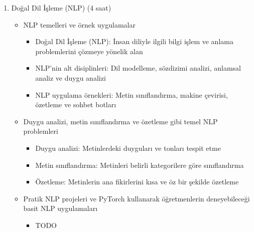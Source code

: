 \documentclass[12pt]{article}
\begin{document}
\begin{enumerate}
    
    \item Doğal Dil İşleme (NLP) (4 saat)
    \begin{itemize}
        \item NLP temelleri ve örnek uygulamalar
        \begin{itemize}
            \item Doğal Dil İşleme (NLP): İnsan diliyle ilgili bilgi işlem ve anlama problemlerini çözmeye yönelik alan
            \item NLP'nin alt disiplinleri: Dil modelleme, sözdizimi analizi, anlamsal analiz ve duygu analizi
            \item NLP uygulama örnekleri: Metin sınıflandırma, makine çevirisi, özetleme ve sohbet botları
        \end{itemize}
        \item Duygu analizi, metin sınıflandırma ve özetleme gibi temel NLP problemleri
        \begin{itemize}
            \item Duygu analizi: Metinlerdeki duyguları ve tonları tespit etme
            \item Metin sınıflandırma: Metinleri belirli kategorilere göre sınıflandırma
            \item Özetleme: Metinlerin ana fikirlerini kısa ve öz bir şekilde özetleme
        \end{itemize}
        \item Pratik NLP projeleri ve PyTorch kullanarak öğretmenlerin deneyebileceği basit NLP uygulamaları
        \begin{itemize}
            \item TODO
        \end{itemize}
    \end{itemize}


\end{enumerate}
\end{document}
